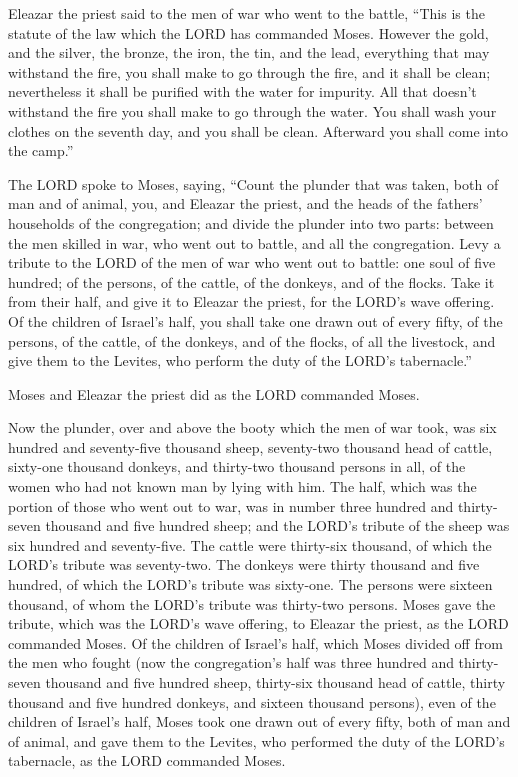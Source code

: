  Eleazar the priest said to the men of war who went to
the battle, ``This is the statute of the law which the LORD has
commanded Moses.  However the gold, and the silver, the
bronze, the iron, the tin, and the lead,  everything that
may withstand the fire, you shall make to go through the fire, and it
shall be clean; nevertheless it shall be purified with the water for
impurity. All that doesn't withstand the fire you shall make to go
through the water.  You shall wash your clothes on the
seventh day, and you shall be clean. Afterward you shall come into the
camp.''

 The LORD spoke to Moses, saying,  ``Count
the plunder that was taken, both of man and of animal, you, and Eleazar
the priest, and the heads of the fathers' households of the
congregation;  and divide the plunder into two parts:
between the men skilled in war, who went out to battle, and all the
congregation.  Levy a tribute to the LORD of the men of
war who went out to battle: one soul of five hundred; of the persons, of
the cattle, of the donkeys, and of the flocks.  Take it
from their half, and give it to Eleazar the priest, for the LORD's wave
offering.  Of the children of Israel's half, you shall
take one drawn out of every fifty, of the persons, of the cattle, of the
donkeys, and of the flocks, of all the livestock, and give them to the
Levites, who perform the duty of the LORD's tabernacle.''

 Moses and Eleazar the priest did as the LORD commanded
Moses.

 Now the plunder, over and above the booty which the men
of war took, was six hundred and seventy-five thousand sheep,
 seventy-two thousand head of cattle, 
sixty-one thousand donkeys,  and thirty-two thousand
persons in all, of the women who had not known man by lying with him.
 The half, which was the portion of those who went out to
war, was in number three hundred and thirty-seven thousand and five
hundred sheep;  and the LORD's tribute of the sheep was
six hundred and seventy-five.  The cattle were thirty-six
thousand, of which the LORD's tribute was seventy-two. 
The donkeys were thirty thousand and five hundred, of which the LORD's
tribute was sixty-one.  The persons were sixteen
thousand, of whom the LORD's tribute was thirty-two persons.
 Moses gave the tribute, which was the LORD's wave
offering, to Eleazar the priest, as the LORD commanded Moses.
 Of the children of Israel's half, which Moses divided
off from the men who fought  (now the congregation's half
was three hundred and thirty-seven thousand and five hundred sheep,
 thirty-six thousand head of cattle, 
thirty thousand and five hundred donkeys,  and sixteen
thousand persons),  even of the children of Israel's
half, Moses took one drawn out of every fifty, both of man and of
animal, and gave them to the Levites, who performed the duty of the
LORD's tabernacle, as the LORD commanded Moses.

